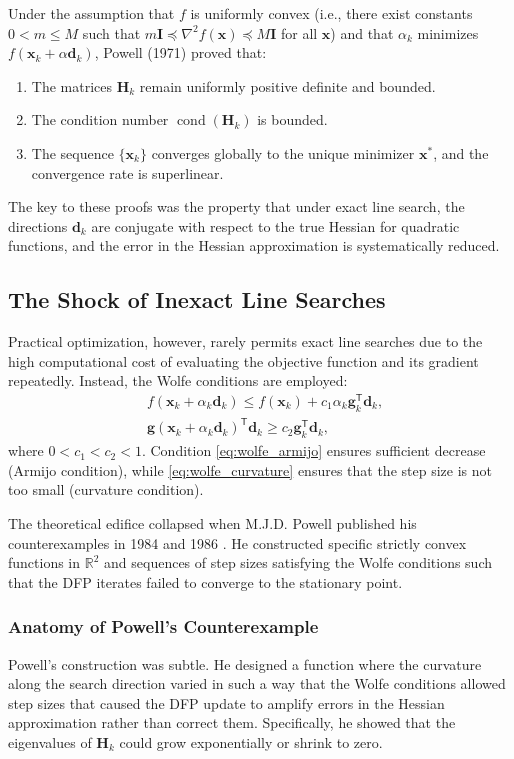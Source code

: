 \documentclass[12pt,a4paper]{article}  %
\newcounter{cite}
\theoremstyle{definition}
\numberwithin{equation}{section}
\DeclareMathOperator{\cond}{cond}
\newcommand{\RR}{\mathbb{R}}
\newcommand{\HH}{\bm{H}}
\newcommand{\II}{\bm{I}}
\newcommand{\trans}{{\scriptstyle{\mathsf{T}}}}
\newcommand{\dd}{\mathbf{d}}
\newcommand{\xx}{\mathbf{x}}
\renewcommand{\ggg}{\mathbf{g}}
\begin{document}
Under the assumption that $f$ is uniformly convex (i.e., there exist constants $0 < m \le M$ such that $m \II \preceq \nabla^2 f(\xx) \preceq M \II$ for all $\xx$) and that $\alpha_k$ minimizes $f(\xx_k + \alpha \dd_k)$, Powell (1971) proved that:
\begin{enumerate}
    \item The matrices $\HH_k$ remain uniformly positive definite and bounded.
    \item The condition number $\cond(\HH_k)$ is bounded.
    \item The sequence $\{\xx_k\}$ converges globally to the unique minimizer $\xx^*$, and the convergence rate is superlinear.
\end{enumerate}
The key to these proofs was the property that under exact line search, the directions $\dd_k$ are conjugate with respect to the true Hessian for quadratic functions, and the error in the Hessian approximation is systematically reduced.

\subsection{The Shock of Inexact Line Searches}
Practical optimization, however, rarely permits exact line searches due to the high computational cost of evaluating the objective function and its gradient repeatedly. Instead, the Wolfe conditions are employed:
\begin{align}
    &f(\xx_k + \alpha_k \dd_k) \le f(\xx_k) + c_1 \alpha_k \ggg_k^\trans \dd_k, \label{eq:wolfe_armijo} \\
    &\ggg(\xx_k + \alpha_k \dd_k)^\trans \dd_k \ge c_2 \ggg_k^\trans \dd_k, \label{eq:wolfe_curvature}
\end{align}
where $0 < c_1 < c_2 < 1$. Condition \eqref{eq:wolfe_armijo} ensures sufficient decrease (Armijo condition), while \eqref{eq:wolfe_curvature} ensures that the step size is not too small (curvature condition).

The theoretical edifice collapsed when M.J.D. Powell published his counterexamples in 1984 and 1986 \cite{powell1984,powell1986}. He constructed specific strictly convex functions in $\RR^2$ and sequences of step sizes satisfying the Wolfe conditions such that the DFP iterates failed to converge to the stationary point.

\subsubsection{Anatomy of Powell's Counterexample}
Powell's construction was subtle. He designed a function where the curvature along the search direction varied in such a way that the Wolfe conditions allowed step sizes that caused the DFP update to amplify errors in the Hessian approximation rather than correct them. Specifically, he showed that the eigenvalues of $\HH_k$ could grow exponentially or shrink to zero.
\end{document}
